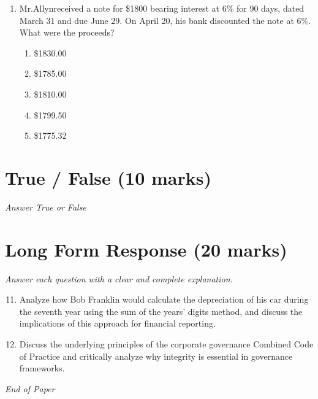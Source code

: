\documentclass[12pt]{article}
\begin{document}
\begin{enumerate}[label=\arabic*.]
\begin{enumerate}[label=(\alph*)]
    \item \$3035
    \item \$2,985.75
    \item \$3,000
    \item \$3024.34
    \item \$210
\end{enumerate}
\item Mr.Allynreceived a note for \$1800 bearing interest at 6\% for 90 days, dated March 31 and due June 29. On April 20, his bank discounted the note at 6\%. What were the proceeds?
\begin{enumerate}[label=(\alph*)]
    \item \$1830.00
    \item \$1785.00
    \item \$1810.00
    \item \$1799.50
    \item \$1775.32
\end{enumerate}
\end{enumerate}

\section*{True / False (10 marks)}
\textit{Answer True or False}

\section*{Long Form Response (20 marks)}
\textit{Answer each question with a clear and complete explanation.}
\begin{enumerate}[label=\arabic*.]
\setcounter{enumi}{10}
\item Analyze how Bob Franklin would calculate the depreciation of his car during the seventh year using the sum of the years' digits method, and discuss the implications of this approach for financial reporting.
\item Discuss the underlying principles of the corporate governance Combined Code of Practice and critically analyze why integrity is essential in governance frameworks.
\end{enumerate}

\vfill
\noindent\textit{End of Paper}
\end{document}
